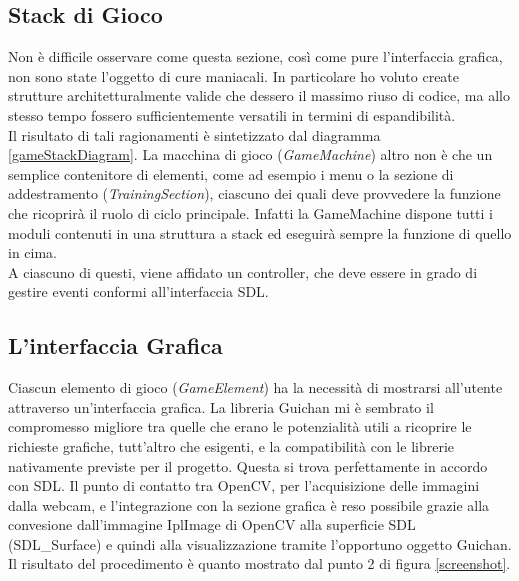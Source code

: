 \documentclass[a4paper,10pt, twocolumn]{article}
\begin{document}
  \subsection{Stack di Gioco}
  Non \`{e} difficile osservare come questa sezione, 
  cos\`{i} come pure l'interfaccia grafica, non sono state l'oggetto di cure maniacali.
  In particolare ho voluto create strutture architetturalmente valide che dessero il
  massimo riuso di codice, ma allo stesso tempo fossero sufficientemente versatili in termini
  di espandibilit\`{a}.\\
  Il risultato di tali ragionamenti \`{e} sintetizzato dal diagramma \ref{gameStackDiagram}.
  La macchina di gioco (\textit{GameMachine}) altro non \`{e} che un semplice contenitore di
  elementi, come ad esempio i menu o la sezione di addestramento (\textit{TrainingSection}), 
  ciascuno dei quali deve provvedere la funzione che ricoprir\`{a} il ruolo di 
  ciclo principale. Infatti la GameMachine dispone tutti i moduli contenuti in una 
  struttura a stack ed eseguir\`{a} sempre la funzione di quello in cima.\\
  A ciascuno di questi, viene 
  affidato un controller, che deve essere in grado di gestire eventi 
  conformi all'interfaccia SDL.
    
  \subsection{L'interfaccia Grafica}
  Ciascun elemento di gioco (\textit{GameElement}) ha la necessit\`{a} di mostrarsi all'utente
  attraverso un'interfaccia grafica. La libreria Guichan \cite{guichan} mi \`{e}
  sembrato il compromesso migliore tra quelle che erano
  le potenzialit\`{a} utili a ricoprire le richieste grafiche, tutt'altro che esigenti,
  e la compatibilit\`{a} con le librerie nativamente previste per il progetto.
  Questa si trova perfettamente in accordo con SDL. Il punto di contatto tra 
  OpenCV, per l'acquisizione delle immagini dalla webcam, e l'integrazione con 
  la sezione grafica \`{e} reso possibile grazie alla convesione dall'immagine 
  IplImage di OpenCV alla superficie SDL (SDL\_Surface) e quindi alla visualizzazione
  tramite l'opportuno oggetto Guichan. Il risultato del procedimento \`{e}
  quanto mostrato dal punto 2 di figura \ref{screenshot}.
  
\end{document}
